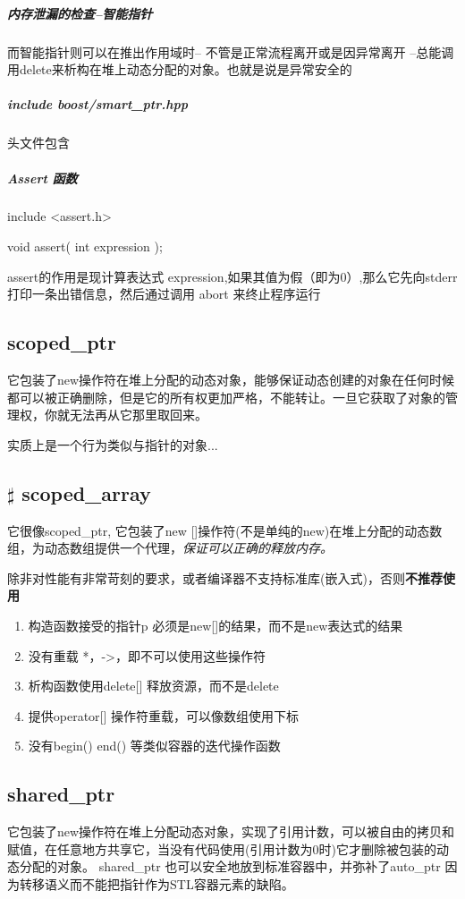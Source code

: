\documentclass[UTF8,a4paper,12pt]{ctexbook}
\begin{document}
			\subparagraph{内存泄漏的检查--智能指针}
				而智能指针则可以在推出作用域时-- 不管是正常流程离开或是因异常离开 --总能调用delete来析构在堆上动态分配的对象。也就是说是异常安全的
				
			\subparagraph{include boost/smart\_ptr.hpp}
				头文件包含
				
			\subparagraph{Assert 函数}
				include <assert.h>
				
				void assert( int expression );
				
				assert的作用是现计算表达式 expression,如果其值为假（即为0）,那么它先向stderr打印一条出错信息，然后通过调用 abort 来终止程序运行
	
		\subsection{scoped\_ptr}
			它包装了new操作符在堆上分配的动态对象，能够保证动态创建的对象在任何时候都可以被正确删除，但是它的所有权更加严格，不能转让。一旦它获取了对象的管理权，你就无法再从它那里取回来。
			
			实质上是一个行为类似与指针的对象...
			
		\subsection{$\sharp$ scoped\_array}
			它很像scoped\_ptr, 它包装了new []操作符(不是单纯的new)在堆上分配的动态数组，为动态数组提供一个代理，\textit{保证可以正确的释放内存。}
			
			除非对性能有非常苛刻的要求，或者编译器不支持标准库(嵌入式)，否则\textbf{不推荐使用}
			\begin{enumerate}[fullwidth,itemindent= 3em]
				\item 构造函数接受的指针p 必须是new[]的结果，而不是new表达式的结果
				\item 没有重载 *，->，即不可以使用这些操作符
				\item 析构函数使用delete[] 释放资源，而不是delete
				\item 提供operator[] 操作符重载，可以像数组使用下标
				\item 没有begin() end() 等类似容器的迭代操作函数
			\end{enumerate}
			
		\subsection{shared\_ptr}
			它包装了new操作符在堆上分配动态对象，实现了引用计数，可以被自由的拷贝和赋值，在任意地方共享它，当没有代码使用(引用计数为0时)它才删除被包装的动态分配的对象。 shared\_ptr 也可以安全地放到标准容器中，并弥补了auto\_ptr 因为转移语义而不能把指针作为STL容器元素的缺陷。
			
\end{document}
